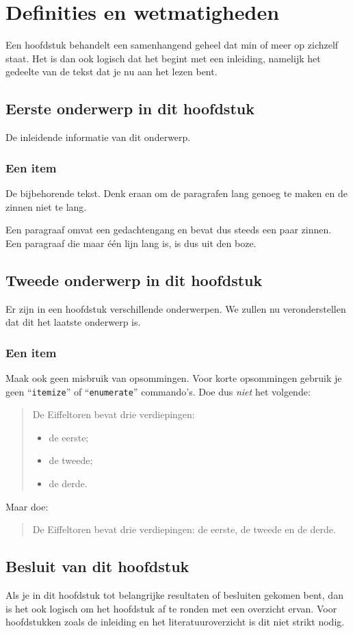 \chapter{Definities en wetmatigheden}
\label{hoofdstuk:1}
Een hoofdstuk behandelt een samenhangend geheel dat min of meer op zichzelf
staat. Het is dan ook logisch dat het begint met een inleiding, namelijk
het gedeelte van de tekst dat je nu aan het lezen bent.

\section{Eerste onderwerp in dit hoofdstuk}
De inleidende informatie van dit onderwerp.

\subsection{Een item}
De bijbehorende tekst. Denk eraan om de paragrafen lang genoeg te maken en
de zinnen niet te lang.

Een paragraaf omvat een gedachtengang en bevat dus steeds een paar zinnen.
Een paragraaf die maar \'e\'en lijn lang is, is dus uit den boze.

\section{Tweede onderwerp in dit hoofdstuk}
Er zijn in een hoofdstuk verschillende onderwerpen. We zullen nu
veronderstellen dat dit het laatste onderwerp is.

\subsection{Een item}
Maak ook geen misbruik van opsommingen. Voor korte opsommingen gebruik je
geen ``\verb|itemize|'' of ``\texttt{enumerate}'' commando's. Doe dus
\emph{niet} het volgende:
\begin{quote}
  De Eiffeltoren bevat drie verdiepingen:
  \begin{itemize}
  \item de eerste;
  \item de tweede;
  \item de derde.
  \end{itemize}
\end{quote}
Maar doe:
\begin{quote}
  De Eiffeltoren bevat drie verdiepingen: de eerste, de tweede en de derde.
\end{quote}

\section{Besluit van dit hoofdstuk}
Als je in dit hoofdstuk tot belangrijke resultaten of besluiten gekomen
bent, dan is het ook logisch om het hoofdstuk af te ronden met een
overzicht ervan. Voor hoofdstukken zoals de inleiding en het
literatuuroverzicht is dit niet strikt nodig.

